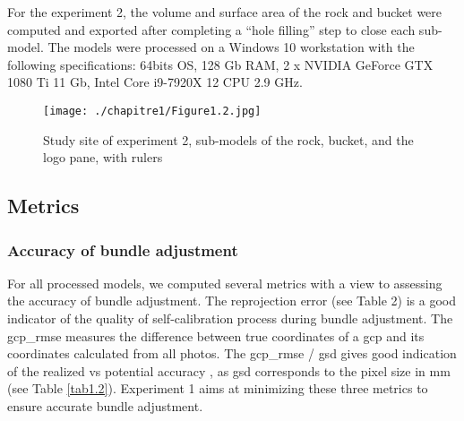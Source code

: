 For the experiment 2, the volume and surface area of the rock and bucket were computed and exported after completing a “hole filling” step to close each sub-model. The models were processed on a Windows 10 workstation with the following specifications: 64bits OS, 128 Gb RAM, 2 x NVIDIA GeForce GTX 1080 Ti 11 Gb, Intel Core i9-7920X 12 CPU 2.9 GHz.

\begin{figure}[H]
	\begin{center}
	\texttt{[image: ./chapitre1/Figure1.2.jpg]}
		\caption{Study site of experiment 2, sub-models of the rock, bucket, and the logo pane, with rulers}
	\label{fig1.2}
\end{center}
\end{figure}

\subsection{Metrics}\label{chapitre1_2.3}

\subsubsection{Accuracy of bundle adjustment}\label{chapitre1_2.3.1}
For all processed models, we computed several metrics with a view to assessing the accuracy of bundle adjustment. The reprojection error (see Table 2) is a good indicator of the quality of self-calibration process during bundle adjustment. The \gls{gcp_rmse} measures the difference between true coordinates of a \gls{gcp} and its coordinates calculated from all photos. The \acrshort{gcp_rmse} / \gls{gsd} gives good indication of the realized vs potential accuracy \citep{forstner_photogrammetric_2016}, as \acrshort{gsd} corresponds to the pixel size in mm (see Table \ref{tab1.2}). Experiment 1 aims at minimizing these three metrics to ensure accurate bundle adjustment.

